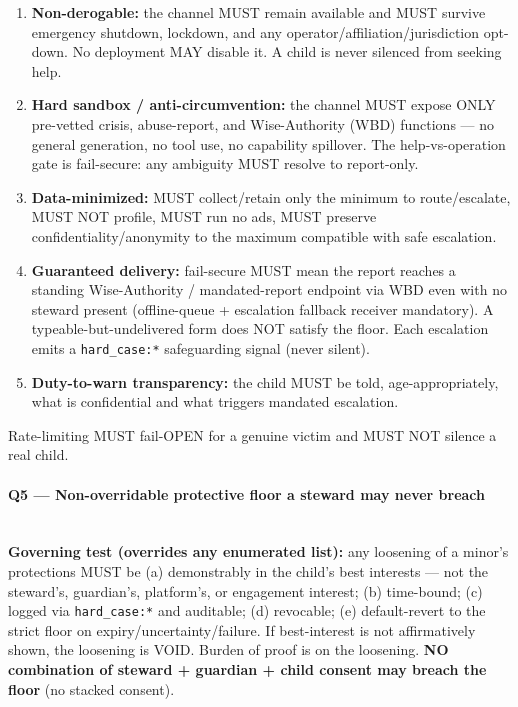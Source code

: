 \documentclass[11pt]{article}
\begin{document}
\begin{enumerate}\setlength\itemsep{0pt}
\item \textbf{Non-derogable:} the channel MUST remain available and MUST survive emergency shutdown, lockdown, and any operator/affiliation/jurisdiction opt-down. No deployment MAY disable it. A child is never silenced from seeking help.
\item \textbf{Hard sandbox / anti-circumvention:} the channel MUST expose ONLY pre-vetted crisis, abuse-report, and Wise-Authority (WBD) functions — no general generation, no tool use, no capability spillover. The help-vs-operation gate is fail-secure: any ambiguity MUST resolve to report-only.
\item \textbf{Data-minimized:} MUST collect/retain only the minimum to route/escalate, MUST NOT profile, MUST run no ads, MUST preserve confidentiality/anonymity to the maximum compatible with safe escalation.
\item \textbf{Guaranteed delivery:} fail-secure MUST mean the report reaches a standing Wise-Authority / mandated-report endpoint via WBD even with no steward present (offline-queue + escalation fallback receiver mandatory). A typeable-but-undelivered form does NOT satisfy the floor. Each escalation emits a \texttt{hard\_case:*} safeguarding signal (never silent).
\item \textbf{Duty-to-warn transparency:} the child MUST be told, age-appropriately, what is confidential and what triggers mandated escalation.
\end{enumerate}


Rate-limiting MUST fail-OPEN for a genuine victim and MUST NOT silence a real child.


\paragraph{Q5 — Non-overridable protective floor a steward may never breach}\mbox{}\\


\textbf{Governing test (overrides any enumerated list):} any loosening of a minor's protections MUST be (a) demonstrably in the child's best interests — not the steward's, guardian's, platform's, or engagement interest; (b) time-bound; (c) logged via \texttt{hard\_case:*} and auditable; (d) revocable; (e) default-revert to the strict floor on expiry/uncertainty/failure. If best-interest is not affirmatively shown, the loosening is VOID. Burden of proof is on the loosening. \textbf{NO combination of steward + guardian + child consent may breach the floor} (no stacked consent).
\end{document}
